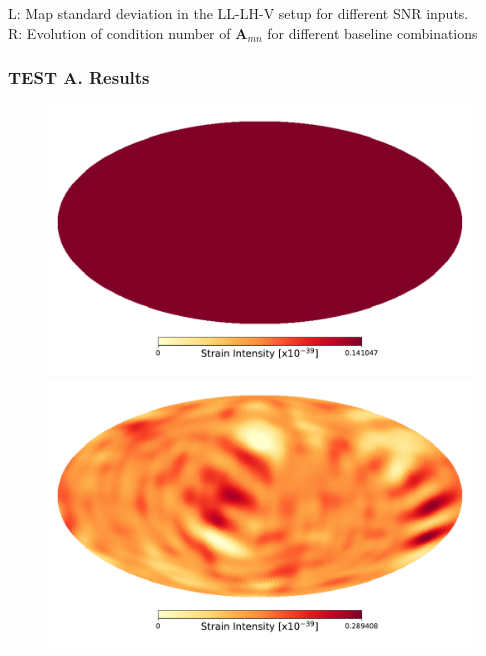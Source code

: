 \documentclass[handout]{beamer}
\begin{document}
{\begin{frame}
{\begin{minipage}{0.491\linewidth}
\end{minipage}
\small
\flushleft
\textcolor{textcoldark}{
L: Map standard deviation in the LL-LH-V setup for different SNR inputs.\\
\vskip 0.25cm
R: Evolution of condition number of  $\bm A_{mn}$ for different baseline combinations
}
}

 \end{frame}

 \begin{frame}
\frametitle{\textcolor{textcoldark}{TEST A. Results}}

\begin{figure}
\centering
\begin{minipage}{0.49\textwidth}
\centering
\includegraphics[width=0.9\columnwidth]{1pole1_low}
\end{minipage}\hfill
\begin{minipage}{0.49\textwidth}
\centering
\includegraphics[width=0.9\columnwidth]{1pole2_low}
\end{minipage}\\

\end{figure}
\end{frame}}
\end{document}
